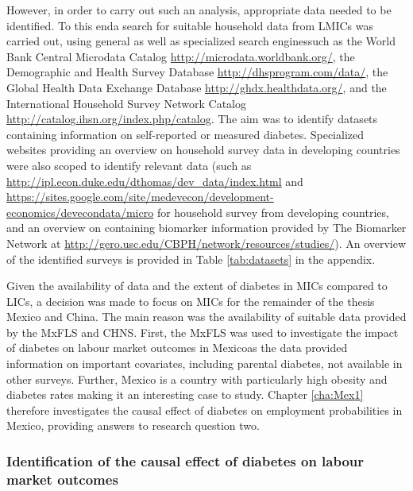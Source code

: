 However, in order to carry out such an analysis, appropriate data needed to be identified. To this end\DIFaddbegin \DIFadd{, }\DIFaddend a search for suitable household data from \acp{LMIC} was carried out, using general as well as specialized search engines\DIFaddbegin \DIFadd{, }\DIFaddend such as the World Bank Central Microdata Catalog  \url{http://microdata.worldbank.org/}, the Demographic and Health Survey Database \url{http://dhsprogram.com/data/}, the Global Health Data Exchange Database \url{http://ghdx.healthdata.org/}, and the International Household Survey Network Catalog \url{http://catalog.ihsn.org/index.php/catalog}. The aim was to identify datasets containing information on self-reported or measured diabetes. Specialized websites providing an overview on household survey data in developing countries were also scoped to identify relevant data (such as \url{http://ipl.econ.duke.edu/dthomas/dev_data/index.html} and \url{https://sites.google.com/site/medevecon/development-economics/devecondata/micro} for household survey from developing countries, and an overview on \DIFdelbegin {}\DIFdelend \DIFaddbegin {}\DIFaddend containing biomarker information provided by The Biomarker Network at \url{http://gero.usc.edu/CBPH/network/resources/studies/}). An overview of the identified surveys is provided in Table \ref{tab:datasets} in the appendix.

Given the availability of data and the extent of diabetes in \acp{MIC} compared to \acp{LIC}, a decision was made to focus on \acp{MIC} for the remainder of the thesis \DIFdelbegin {}\DIFdelend \DIFaddbegin {}\DIFaddend Mexico and China\DIFdelbegin {}\DIFdelend . The main reason was the availability of suitable  data provided by the \ac{MxFLS} and \ac{CHNS}. First, the \ac{MxFLS} was used to investigate the impact of diabetes on labour market outcomes in Mexico\DIFaddbegin \DIFadd{, }\DIFaddend as the data provided information on important covariates, including parental diabetes, not available in other surveys. Further, Mexico is a country with particularly high obesity and diabetes rates making it an interesting case to study. Chapter \ref{cha:Mex1} therefore investigates the causal effect of diabetes on employment probabilities in Mexico, providing \DIFdelbegin {}\DIFdelend answers to research question two.

\subsubsection{Identification of the causal effect of diabetes on labour market outcomes}

